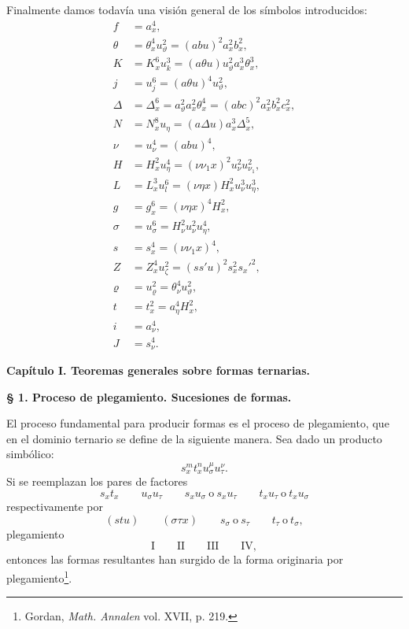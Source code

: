 \documentclass[11pt]{article}
\begin{document}
Finalmente damos todavía una visión general de los símbolos introducidos:
\begin{align*}
f&=a_x^4,\\
\theta&=\theta_x^4u_\vartheta^2=(abu)^2a_x^2b_x^2,\\
K&=K_x^6u_k^3=(a\theta u)u_\vartheta^2a_x^3\theta_x^3,\\
j&=u_j^6=(a\theta u)^4u_\vartheta^2,\\
\Delta&=\Delta_x^6=a_\vartheta^2a_x^2\theta_x^4=(abc)^2a_x^2b_x^2c_x^2,\\
N&=N_x^8u_\eta=(a\Delta u)a_x^3\Delta_x^5,\\
\nu&=u_\nu^4=(abu)^4,\\
H&=H_x^2u_\eta^4=(\nu\nu_1x)^2u_\nu^2u_{\nu_1}^2,\\
L&=L_x^3u_l^6=(\nu\eta x)H_x^2u_\nu^3u_\eta^3,\\
g&=g_x^6=(\nu\eta x)^4H_x^2,\\
\sigma&=u_\sigma^6=H_\nu^2u_\nu^2u_\eta^4,\\
s&=s_x^4=(\nu\nu_1x)^4,\\
Z&=Z_x^4u_\zeta^2=(ss'u)^2s_x^2s_x'^2,\\
\varrho&=u_\varrho^2=\theta_\nu^4u_\vartheta^2,\\
t&=t_x^2=a_\eta^4H_x^2,\\
i&=a_\nu^4,\\
J&=s_\nu^4.
\end{align*}

\begin{center}
{\Large\bfseries Capítulo I. \quad Teoremas generales sobre formas ternarias.}
\end{center}

\begin{center}
\textbf{§ 1. \quad Proceso de plegamiento. \quad Sucesiones de formas.}
\end{center}

El proceso fundamental para producir formas es el proceso de plegamiento, que en el dominio ternario se define de la siguiente manera. Sea dado un producto simbólico:
\[
s_x^m t_x^n u_\sigma^\mu u_\tau^\nu .
\]
Si se reemplazan los pares de factores
\[
s_xt_x\qquad u_\sigma u_\tau\qquad s_xu_\sigma\ \text{o}\ s_xu_\tau
\qquad t_xu_\tau\ \text{o}\ t_xu_\sigma
\]
respectivamente por
\[
(stu)\qquad (\sigma\tau x)\qquad s_\sigma\ \text{o}\ s_\tau
\qquad t_\tau\ \text{o}\ t_\sigma,
\]
plegamiento
\[
\text{I}\qquad\text{II}\qquad\text{III}\qquad\text{IV},
\]
entonces las formas resultantes han surgido de la forma originaria por plegamiento\footnote{Gordan, \emph{Math. Annalen} vol. XVII, p. 219.}.
\end{document}

